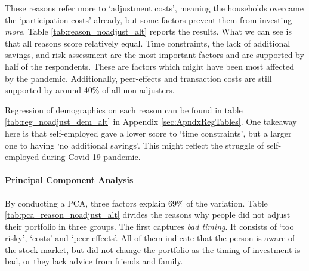 \documentclass[ProjectABM]{subfiles}
\begin{document}



%




These reasons refer more to `adjustment costs', meaning the households overcame the `participation costs' already, but some factors prevent them from investing \textit{more}. Table \ref{tab:reason_noadjust_alt} reports the results. What we can see is that all reasons score relatively equal. Time constraints, the lack of additional savings, and risk assessment are the most important factors and are supported by half of the respondents. These are factors which might have been most affected by the pandemic. Additionally, peer-effects and transaction costs are still supported by around 40\% of all non-adjusters. 

Regression of demographics on each reason can be found in table \ref{tab:reg_noadjust_dem_alt} in Appendix \ref{sec:ApndxRegTables}. One takeaway here is that self-employed gave a lower score to `time constraints', but a larger one to having `no additional savings'. This might reflect the struggle of self-employed during Covid-19 pandemic.


\paragraph{Principal Component Analysis}
By conducting a PCA, three factors explain 69\% of the variation. Table \ref{tab:pca_reason_noadjust_alt} divides the reasons why people did not adjust their portfolio in three groups. The first captures \textit{bad timing}. It consists of `too risky', `costs' and `peer effects'. All of them indicate that the person is aware of the stock market, but did not change the portfolio as the timing of investment is bad, or they lack advice from friends and family. %
\end{document}
